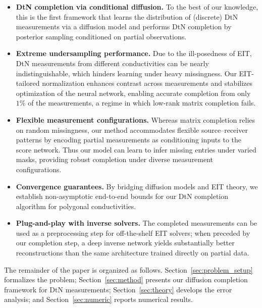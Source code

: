 \documentclass{article}
\begin{document}
\begin{itemize}
  \item \textbf{DtN completion via conditional diffusion.} To the best of our knowledge, this is the first framework that learns the distribution of (discrete) DtN measurements via a diffusion model and performs DtN completion by posterior sampling conditioned on partial observations.

\item \textbf{Extreme undersampling performance.} Due to the ill-posedness of EIT, DtN measurements from different conductivities can be nearly indistinguishable, which hinders learning under heavy missingness. Our EIT-tailored normalization enhances contrast across measurements and stabilizes optimization of the neural network, enabling accurate completion from only $1\%$ of the measurements, a regime in which low-rank matrix completion fails.
\item \textbf{Flexible measurement configurations.} Whereas matrix completion relies on random missingness, our method accommodates flexible source–receiver patterns by encoding partial measurements as conditioning inputs to the score network. Thus our model can learn to infer missing entries under varied masks, providing robust completion under diverse measurement configurations.

  \item \textbf{Convergence guarantees.} By bridging diffusion models and EIT theory, we establish non-asymptotic end-to-end bounds for our DtN completion algorithm for polygonal conductivities.
  \item \textbf{Plug-and-play with inverse solvers.} The completed measurements can be used as a preprocessing step for off-the-shelf EIT solvers; when preceded by our completion step, a deep inverse network yields substantially better reconstructions than the same architecture trained directly on partial data.
\end{itemize}

The remainder of the paper is organized as follows. Section~\ref{sec:problem_setup} formalizes the problem; Section~\ref{sec:method} presents our diffusion completion framework for DtN measurements; Section~\ref{sec:theory} develops the error analysis; and Section~\ref{sec:numeric} reports numerical results.
\end{document}
